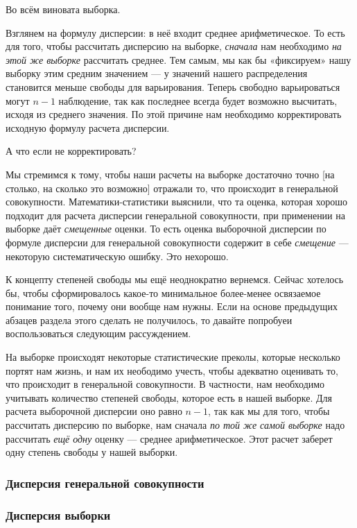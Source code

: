 \documentclass[
  letterpaper,
  DIV=11,
  numbers=noendperiod]{scrreprt}
\theoremstyle{definition}
\theoremstyle{remark}
\begin{document}
Во всём виновата выборка.

Взглянем на формулу дисперсии: в неё входит среднее арифметическое. То
есть для того, чтобы рассчитать дисперсию на выборке, \emph{сначала} нам
необходимо \emph{на этой же выборке} рассчитать среднее. Тем самым, мы
как бы «фиксируем» нашу выборку этим средним значением --- у значений
нашего распределения становится меньше свободы для варьирования. Теперь
свободно варьироваться могут \(n-1\) наблюдение, так как последнее
всегда будет возможно высчитать, исходя из среднего значения. По этой
причине нам необходимо корректировать исходную формулу расчета
дисперсии.

А что если не корректировать?

Мы стремимся к тому, чтобы наши расчеты на выборке достаточно точно
{[}на столько, на сколько это возможно{]} отражали то, что происходит в
генеральной совокупности. Математики-статистики выяснили, что та оценка,
которая хорошо подходит для расчета дисперсии генеральной совокупности,
при применении на выборке даёт \emph{смещенные} оценки. То есть оценка
выборочной дисперсии по формуле дисперсии для генеральной совокупности
содержит в себе \emph{смещение} --- некоторую систематическую ошибку.
Это нехорошо.

К концепту степеней свободы мы ещё неоднократно вернемся. Сейчас
хотелось бы, чтобы сформировалось какое-то минимальное более-менее
освязаемое понимание того, почему они вообще нам нужны. Если на основе
предыдущих абзацев раздела этого сделать не получилось, то давайте
попробуеи воспользоваться следующим рассуждением.

На выборке происходят некоторые статистические преколы, которые
несколько портят нам жизнь, и нам их неободимо учесть, чтобы адекватно
оценивать то, что происходит в генеральной совокупности. В частности,
нам необходимо учитывать количество степеней свободы, которое есть в
нашей выборке. Для расчета выборочной дисперсии оно равно \(n-1\), так
как мы для того, чтобы рассчитать дисперсию по выборке, нам сначала
\emph{по той же самой выборке} надо рассчитать \emph{ещё одну} оценку
--- среднее арифметическое. Этот расчет заберет одну степень свободы у
нашей выборки.

\subsubsection{Дисперсия генеральной
совокупности}\label{andan-descriptives-population-variance}

\subsubsection{Дисперсия
выборки}\label{andan-descriptives-sample-variance}
\end{document}

